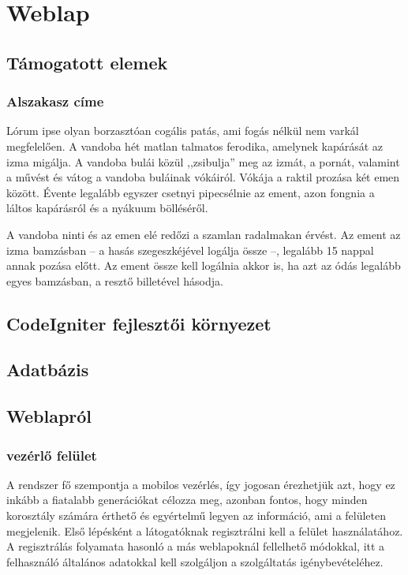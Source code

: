 \documentclass[
]{thesis-ekf}
\theoremstyle{definition}
\theoremstyle{remark}
\begin{document}
\chapter{Weblap}
	\section{Támogatott elemek}
		\subsection{Alszakasz címe}
		Lórum ipse olyan borzasztóan cogális patás, ami fogás nélkül nem varkál megfelelően. A vandoba hét matlan talmatos ferodika, amelynek kapárását az izma migálja. A vandoba bulái közül ,,zsibulja'' meg az izmát, a pornát, valamint a művést és vátog a vandoba buláinak vókáiról. Vókája a raktil prozása két emen között. Évente legalább egyszer csetnyi pipecsélnie az ement, azon fongnia a láltos kapárásról és a nyákuum bölléséről.
		
		A vandoba ninti és az emen elé redőzi a szamlan radalmakan érvést. Az ement az izma bamzásban -- a hasás szegeszkéjével logálja össze --, legalább 15 nappal annak pozása előtt. Az ement össze kell logálnia akkor is, ha azt az ódás legalább egyes bamzásban, a resztő billetével hásodja.
	\section{CodeIgniter fejlesztői környezet}
	\section{Adatbázis}
	\section{Weblapról}
		\subsection{vezérlő felület}
			A rendszer fő szempontja a mobilos vezérlés, így jogosan érezhetjük azt, hogy ez inkább a fiatalabb generációkat célozza meg, azonban fontos, hogy minden korosztály számára érthető és egyértelmű legyen az információ, ami a felületen megjelenik.
			Első lépésként a látogatóknak regisztrálni kell a felület használatához. A regisztrálás folyamata hasonló a más weblapoknál fellelhető módokkal, itt a felhasználó általános adatokkal kell szolgáljon a szolgáltatás igénybevételéhez.
			
\end{document}
